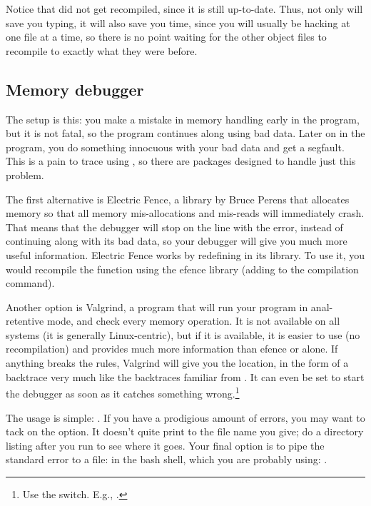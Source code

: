 \documentclass[12pt]{article}
\makeatletter
\def\ind#1{\index{#1}#1}
\def\cind#1{\index{#1@\cinline{#1}}\cinline{#1}}
\makeatother
\begin{document}
Notice that  did not get recompiled, since it is still
up-to-date. Thus, not only will  save you typing, it will also
save you time, since you will usually be hacking at one file at a time,
so there is no point waiting for the other object files to recompile
to exactly what they were before. 

\subsection{Memory debugger}  

The setup is this: you make a mistake in memory handling early in the
program, but it is not fatal, so the program continues along using bad
data. Later on in the program, you do something innocuous with your bad
data and get a segfault. This is a pain to trace using , so
there are packages designed to handle just this problem.

The first alternative is \ind{Electric Fence}, a
library by Bruce Perens that allocates memory so that all memory
mis-allocations and mis-reads will immediately crash.  That means that
the debugger will stop on the line with the error, instead of continuing
along with its bad data, so your debugger will give you much more useful
information.  Electric Fence works by redefining \cind{malloc} in 
its library. To use it, you would recompile the function
using the efence library (adding  to the compilation
command).


Another option is \ind{Valgrind}, a program that will
run your program in anal-retentive mode, and check every memory operation. 
It is not available on all systems (it is generally Linux-centric), but
if it is available, it is easier to use (no recompilation) and provides much more information than efence or
 alone. If anything breaks the rules, Valgrind will give you
the location, in the form of a backtrace very much like the backtraces
familiar from . It can even be set to start the debugger as soon
as it catches something wrong.\footnote{Use the  switch.
E.g., .}

The usage is simple: . If you have a prodigious amount
of errors, you may want to tack on the  option. It doesn't
quite print to the file name you give; do a directory listing after you run  to see where it goes.  Your final option is to pipe the standard
error to a file: in the bash shell, which you are probably using: .
\end{document}
